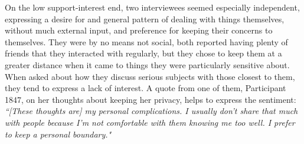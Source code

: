   On the low support-interest end, two interviewees seemed especially independent,
  expressing a desire for and general pattern of dealing with things
  themselves, without much external input,
  and preference for keeping their concerns to themselves.
  They were by no means not social,
  both reported having plenty of friends that they interacted with regularly,
  but they chose to keep them at a greater distance when it came to things
  they were particularly sensitive about.
  When asked
  about how they discuss serious subjects with those closest to them,
  they tend to express a lack of interest.
  A quote from one of them, Participant 1847,
  on her thoughts about keeping her privacy,
  helps to express the sentiment:
  \textit{
  ``[These thoughts are] my personal complications.
  I usually don't share that much with people because
  I'm not comfortable with them knowing me too well.
  I prefer to keep a personal boundary."
  }

